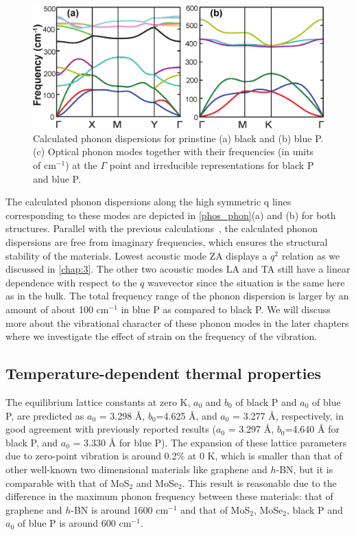 \begin{figure}[htbp]
\centering
\includegraphics[width=0.8\linewidth]{phos_phon.eps}%
\caption{Calculated phonon dispersions for prinstine (a) black and (b) blue P. (c) Optical phonon modes together with their frequencies (in units of cm$^{-1}$) at the $\Gamma$ point and irreducible representations for black P and blue P.\label{phos_phon}}
\end{figure}

The calculated phonon dispersions along the high symmetric q lines corresponding to these modes are depicted in \autoref{phos_phon}(a) and (b) for both structures. Parallel with the previous calculations~\cite{phonon-blackP,phonon-blackP-1}, the calculated phonon dispersions are free from imaginary frequencies, which ensures the structural stability of the materials. Lowest acoustic mode ZA displays a $q^2$ relation as we discussed in \autoref{chap:3}.  The other two acoustic modes LA and TA still have a linear dependence with respect to the $q$ wavevector since the situation is the same here as in the bulk. The total frequency range of the phonon dispersion is larger by an amount of about 100 cm$^{-1}$ in blue P as compared to black P. We will discuss more about the vibrational character of these phonon modes in the later chapters where we investigate the effect of strain on the frequency of the vibration.

\subsection{Temperature-dependent thermal properties}

The equilibrium lattice constants at zero K, $a_0$ and $b_0$ of black P and $a_0$ of blue P, are predicted as $a_0$ = 3.298 {\AA}, $b_0$=4.625 {\AA}, and  $a_0$ = 3.277 {\AA}, respectively,  in  good agreement with previously reported results ($a_0$ = 3.297 {\AA}, $b_0$=4.640 {\AA} for black P\cite{fei,deniz3}, and  $a_0$ = 3.330 {\AA} for blue P\cite{Zhu2014}). 
The expansion of these lattice parameters due to zero-point vibration is around 0.2\% at 0 K, which is smaller than that of other well-known two dimensional materials like graphene and $h$-BN, but it is comparable with that of MoS$_2$ and MoSe$_2$. This result is reasonable due to the difference in the maximum phonon frequency between these materials: that of graphene and $h$-BN is around 1600 cm$^{-1}$ and that of MoS$_2$, MoSe$_2$, black P and $a_0$ of blue P is around 600 cm$^{-1}$. 

